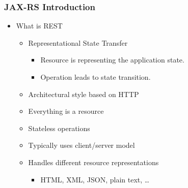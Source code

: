 \documentclass[10pt,xcolor=pdflatex]{beamer}
\begin{document}
\begin{frame}[containsverbatim]\frametitle{JAX-RS Introduction}
\begin{itemize}
	\item What is REST
	\begin{itemize}
		\item Representational State Transfer
          \begin{itemize}
            \item Resource is representing the application state.
            \item Operation leads to state transition.
          \end{itemize}
		\item Architectural style based on HTTP
		\item Everything is a resource
        \item Stateless operations
		\item Typically uses client/server model\\[0.05cm]
		\item Handles different resource representations
          \begin{itemize}
            \item HTML, XML, JSON, plain text, \ldots
          \end{itemize}
	\end{itemize}
\end{itemize}
\end{frame}
\end{document}
